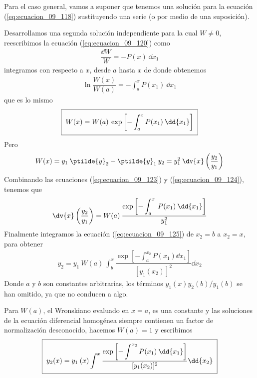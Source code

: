 Para el caso general, vamos a suponer que tenemos una solución para la ecuación (\ref{eq:ecuacion_09_118}) sustituyendo una serie (o por medio de una suposición). 
\par
Desarrollamos una segunda solución independiente para la cual $W \neq 0$, reescribimos la ecuación (\ref{eq:ecuacion_09_120}) como
\begin{align*}
\dfrac{\dd{W}}{W} = - P(x) \: \dd{x_{1}}
\end{align*}
integramos con respecto a $x$, desde $a$ hasta $x$ de donde obtenemos
\begin{align*}
\ln \dfrac{W(x)}{W(a)} = - \int_{a}^{x} P(x_{1}) \: \dd{x_{1}}
\end{align*}
que es lo mismo
\begin{align}
\setlength{\fboxsep}{2\fboxsep}\boxed{W(x) = W(a) \: \exp \left[ - \int_{a}^{x} P(x_{1}) \: \dd{x_{1}} \right]}
\label{eq:ecuacion_09_123}
\end{align}
Pero
\begin{align}
W(x) = y_{1} \: \ptilde{y}_{2} - \ptilde{y}_{1} \: y_{2} = y_{1}^{2} \: \dv{x} \left( \dfrac{y_{2}}{y_{1}} \right)
\label{eq:ecuacion_09_124}
\end{align}
Combinando las ecuaciones (\ref{eq:ecuacion_09_123}) y (\ref{eq:ecuacion_09_124}), tenemos que
\begin{align}
\dv{x} \left( \dfrac{y_{2}}{y_{1}} \right) =  W(a) \: \dfrac{\exp \left[\displaystyle - \int_{a}^{x} \: P(x_{1}) \: \dd{x_{1}} \right]}{y^{2}_{1}}
\label{eq:ecuacion_09_125}
\end{align}
Finalmente integramos la ecuación (\ref{eq:ecuacion_09_125}) de $x_{2} = b$ a $x_{2} = x$, para obtener
\begin{align}
y_{2} = y_{1} \: W(a) \: \int_{b}^{x} \dfrac{\exp \left[ \displaystyle - \int_{a}^{x_{2}} P(x_{1}) \dd{x_{1}} \right]}{[y_{1}(x_{2})]^{2}} \dd{x_{2}}
\label{eq:ecuacion_09_126}
\end{align}
Donde $a$ y $b$ son constantes arbitrarias, los términos $y_{1}(x)y_{2}(b)/y_{1}(b)$ se han omitido, ya que no conducen a algo.
\par
Para $W(a)$, el Wronskiano evaluado en $x=a$, es una constante y las soluciones de la ecuación diferencial homogénea siempre contienen un factor de normalización desconocido, hacemos $W(a)=1$ y escribimos
\begin{align}
\setlength{\fboxsep}{2\fboxsep}\boxed{y_{2}(x) =  y_{1} \: (x) \int^{x} \dfrac{\exp \left[ \displaystyle - \int^{x_{2}} P(x_{1}) \: \dd{x_{1}} \right]}{[y_{1}(x_{2})]^{2}} \dd{x_{2}}}
\label{eq:ecuacion_09_127}
\end{align}
